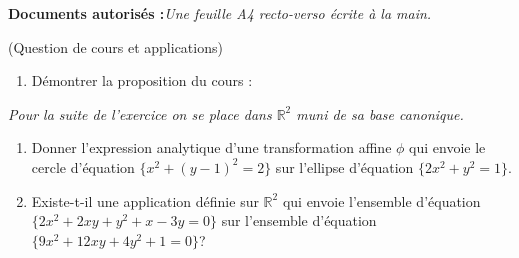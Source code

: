 \documentclass[a4paper,12pt,reqno]{amsart}
\begin{document}
\ifsolutions\else
\textbf{Documents autorisés :}\textit{Une feuille A4 recto-verso écrite à la main.}

\tsvp

\vspace{14mm}
\fi

\begin{exo} (Question de cours et applications)
  \begin{enumerate}
    \item Démontrer la proposition du cours :

  \end{enumerate}

  \medskip
  \emph{Pour la suite de l'exercice on se place dans $\mathbb{R}^{2}$ muni de sa base canonique.}

  \begin{enumerate}[resume]
    \item Donner l'expression analytique d'une transformation affine $\phi$ qui envoie le cercle d'équation $\{x^{2}+(y-1)^{2}=2\}$ sur l'ellipse d'équation $\{2x^{2}+y^{2}=1\}$.

    \item Existe-t-il une application définie sur $\mathbb{R}^{2}$ qui envoie l'ensemble d'équation\\ $\{2x^{2}+2xy+y^{2}+x-3y=0\}$ sur l'ensemble d'équation $\{9x^{2}+12xy+4y^{2}+1=0\}$?
  \end{enumerate}
\end{exo}
\end{document}
